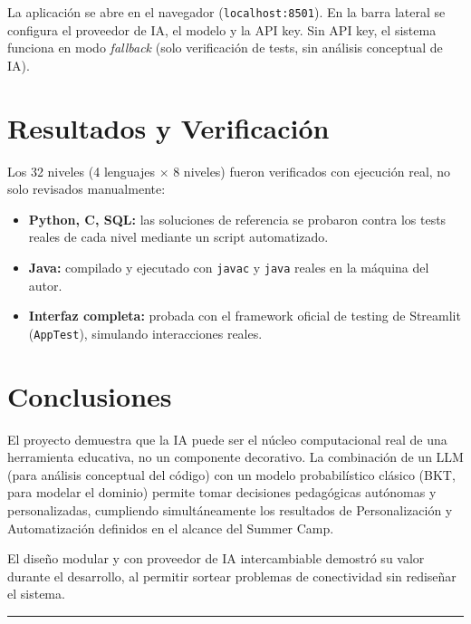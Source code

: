 \documentclass[11pt,letterpaper]{article}
\begin{document}
La aplicación se abre en el navegador (\texttt{localhost:8501}). En la
barra lateral se configura el proveedor de IA, el modelo y la API key.
Sin API key, el sistema funciona en modo \textit{fallback} (solo
verificación de tests, sin análisis conceptual de IA).

\section{Resultados y Verificación}

Los 32 niveles (4 lenguajes $\times$ 8 niveles) fueron verificados con
ejecución real, no solo revisados manualmente:
\begin{itemize}[leftmargin=*]
  \item \textbf{Python, C, SQL:} las soluciones de referencia se
  probaron contra los tests reales de cada nivel mediante un script
  automatizado.
  \item \textbf{Java:} compilado y ejecutado con \texttt{javac} y
  \texttt{java} reales en la máquina del autor.
  \item \textbf{Interfaz completa:} probada con el framework oficial
  de testing de Streamlit (\texttt{AppTest}), simulando interacciones
  reales.
\end{itemize}

\section{Conclusiones}

El proyecto demuestra que la IA puede ser el núcleo computacional real
de una herramienta educativa, no un componente decorativo. La
combinación de un LLM (para análisis conceptual del código) con un
modelo probabilístico clásico (BKT, para modelar el dominio) permite
tomar decisiones pedagógicas autónomas y personalizadas, cumpliendo
simultáneamente los resultados de Personalización y Automatización
definidos en el alcance del Summer Camp.

El diseño modular y con proveedor de IA intercambiable demostró su
valor durante el desarrollo, al permitir sortear problemas de
conectividad sin rediseñar el sistema.

\vspace{1cm}
\noindent\rule{\textwidth}{0.4pt}
\end{document}

